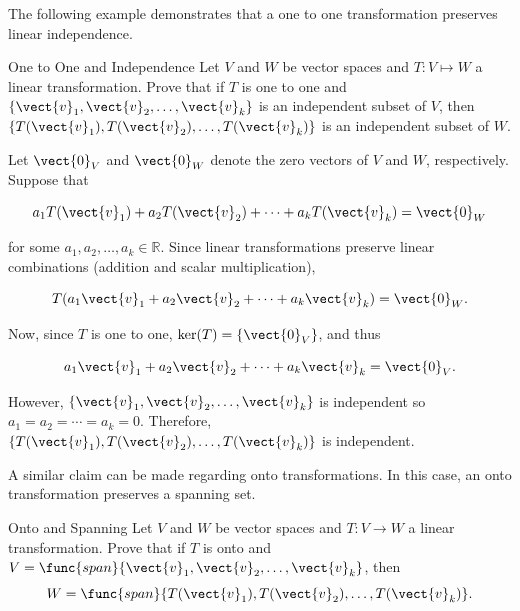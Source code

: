 The following example demonstrates that a one to one transformation preserves linear independence.

\begin{example}{One to One and Independence}\label{exa:preservesindependence}
Let $V$ and $W$ be vector spaces and $T: V \mapsto W$ a linear
transformation.
Prove that if $T$ is one to one and
$\{\vect{v}_1, \vect{v}_2, \ldots, \vect{v}_k\}$ is an independent
subset of $V$, then
$\{T(\vect{v}_1), T(\vect{v}_2), \ldots, T(\vect{v}_k)\}$ is an independent
subset of $W$.
\end{example}

\begin{solution}
Let $\vect{0}_V$ and $\vect{0}_W$ denote the zero vectors of $V$ and $W$,
respectively.
Suppose that 

\[ a_1T(\vect{v}_1) + a_2T(\vect{v}_2) +\cdots +a_kT(\vect{v}_k) =\vect{0}_W \]

for some $a_1, a_2, \ldots, a_k\in\mathbb{R}$.
Since linear transformations preserve linear combinations (addition
and scalar multiplication),

\[ T(a_1\vect{v}_1 + a_2\vect{v}_2 +\cdots +a_k\vect{v}_k) =\vect{0}_W. \]

Now, since $T$ is one to one, $\ker(T)=\{\vect{0}_V\}$, and thus

\[ a_1\vect{v}_1 + a_2\vect{v}_2 +\cdots +a_k\vect{v}_k =\vect{0}_V. \]

\noindent However, $\{\vect{v}_1, \vect{v}_2, \ldots, \vect{v}_k\}$ is independent so $a_1=a_2=\cdots=a_k=0$.
Therefore, $\{T(\vect{v}_1), T(\vect{v}_2), \ldots, T(\vect{v}_k)\}$
is independent.
\end{solution}

A similar claim can be made regarding onto transformations. In this case, an onto transformation preserves a spanning set.

\begin{example}{Onto and Spanning}\label{exa:preservesspanning}
Let $V$ and $W$ be vector spaces and $T:V\to W$ a linear
transformation.
Prove that if $T$ is onto and
$V=\func{span}\{\vect{v}_1, \vect{v}_2, \ldots, \vect{v}_k\}$,
then
\[ W=\func{span}\{T(\vect{v}_1), T(\vect{v}_2), \ldots, T(\vect{v}_k)\}.\]
\end{example}

